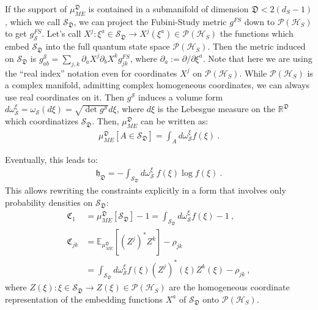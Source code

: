 \documentclass[draft,nofootinbib,pre,twocolumn,showpacs,showkeys,groupaddress,preprintnumbers,floatfix]{revtex4-1}
\newcommand{\1}{\mathbbm{1}}
\newcommand{\ID}{\mathfrak{D}}
\newcommand{\PHS}{\mathcal{P}(\mathcal{H}_S)}
\begin{document}
If the support of $\mu_{ME}^{\ID}$ is contained in a submanifold of dimension
$\ID < 2(d_S-1)$, which we call $\mathcal{S}_{\ID}$, we can project the
Fubini-Study metric $g^{FS}$ down to $\mathcal{P}(\mathcal{H}_S)$ to get
$g_{\mathcal{S}}^{FS}$. Let's call $X^{j}: \xi^a \in \mathcal{S}_{\ID} \to
X^j(\xi^a) \in \mathcal{P}(\mathcal{H}_S)$ the functions which embed
$\mathcal{S}_{\ID}$ into the full quantum state space $\PHS$. Then the metric
induced on $\mathcal{S}_{\ID}$ is $g^{\mathcal{S}}_{ab} =\sum_{j,k}\partial_a
X^{j} \partial_b X^{k} g_{jk}^{FS}$, where $\partial_a := \partial/\partial \xi^a$. Note that here we are using the ``real
index'' notation even for coordinates $X^j$ on $\PHS$. While $\PHS$ is a
complex manifold, admitting complex homogeneous coordinates, we can always use
real coordinates on it. Then $g^{\mathcal{S}}$ induces a volume form
$d\omega^{\xi}_{\mathcal{S}} = \omega_{\mathcal{S}}(d\xi) = \sqrt{\det
g^{\mathcal{S}}}d\xi$, where $d\xi$ is the Lebesgue measure on the
$\mathbb{R}^{\ID}$ which coordinatizes $\mathcal{S}_{\ID}$.  Then,
$\mu_{ME}^{\ID}$ can be written as:
\begin{align*}
\mu_{ME}^{\ID}[A \in \mathcal{S}_{\ID}] = \int_{A} \!\!\! d\omega^{\xi}_{\mathcal{S}} f(\xi)
  ~.
\end{align*}

Eventually, this leads to:
\begin{align*}
\mathfrak{h}_{\ID} = - \int_{\mathcal{S}_\ID}\!\!\! d\omega^{\xi}_{\mathcal{S}}~f(\xi) \log f(\xi)
  ~.
\end{align*}
This allows rewriting the constraints explicitly in a form that involves only probability densities on $\mathcal{S}_{\ID}$:
\begin{subequations}
\begin{align*}
\mathfrak{C}_1 &= \mu_{ME}^{\ID}[\mathcal{S}_{\ID}]-1 = \int_{\mathcal{S}_{\ID}} \!\!\!\! d\omega^{\xi}_{\mathcal{S}}f(\xi) - 1 ~,\\  
\mathfrak{C}_{jk} & = \mathbb{E}_{\mu_{ME}^{\ID}}[(Z^j)^{*}Z^k] - \rho_{jk}\nonumber\\
& = \int_{\mathcal{S}_{\ID}} \!\!\!\! d\omega^{\xi}_{\mathcal{S}}f(\xi)(Z^j)^{*}(\xi) Z^k(\xi) - \rho_{jk} 
  ~,
\end{align*}
\end{subequations}
where $Z(\xi) : \xi \in \mathcal{S}_\ID \to Z(\xi) \in \PHS$ are the homogeneous coordinate representation of the embedding 
functions $X^a$ of $\mathcal{S}_{\ID}$ onto $\PHS$.
\end{document}
